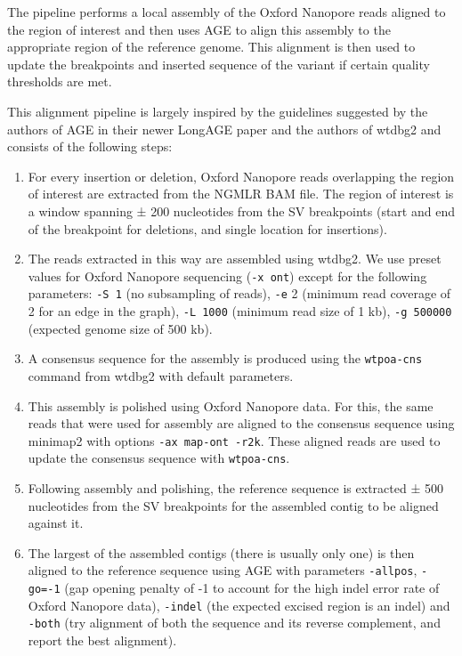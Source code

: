 \documentclass[12pt]{article}
\begin{document}
The pipeline performs a local assembly of the Oxford Nanopore reads aligned to the region of interest and then uses AGE \citep{age} to align this assembly to the appropriate region of the reference genome.
This alignment is then used to update the breakpoints and inserted sequence of the variant if certain quality thresholds are met.

This alignment pipeline is largely inspired by the guidelines suggested by the authors of AGE in their newer LongAGE paper \citep{longage} and the authors of wtdbg2 \citep{wtdbg2} and consists of the following steps:

\begin{enumerate}
	\item For every insertion or deletion, Oxford Nanopore reads overlapping the region of interest are extracted from the NGMLR \citep{ngmlr} BAM file. 
		The region of interest is a window spanning ± 200 nucleotides from the SV breakpoints (start and end of the breakpoint for deletions, and single location for insertions).
\item  The reads extracted in this way are assembled using wtdbg2. 
	We use preset values for Oxford Nanopore sequencing (\texttt{-x ont}) except for the following parameters: \texttt{-S 1} (no subsampling of reads), \texttt{-e} 2 (minimum read coverage of 2 for an edge in the graph), \texttt{-L 1000} (minimum read size of 1 kb), \texttt{-g 500000} (expected genome size of 500 kb).
\item A consensus sequence for the assembly is produced using the \texttt{wtpoa-cns} command from wtdbg2 with default parameters.
\item This assembly is polished using Oxford Nanopore data. For this, the same reads that were used for assembly are aligned to the consensus sequence using minimap2 \citep{minimap2} with options \texttt{-ax map-ont -r2k}. These aligned reads are used to update the consensus sequence with \texttt{wtpoa-cns}.
\item Following assembly and polishing, the reference sequence is extracted ± 500 nucleotides from the SV breakpoints for the assembled contig to be aligned against it.
\item The largest of the assembled contigs (there is usually only one) is then aligned to the reference sequence using AGE with parameters \texttt{-allpos}, \texttt{-go=-1} (gap opening penalty of -1 to account for the high indel error rate of Oxford Nanopore data), \texttt{-indel} (the expected excised region is an indel) and \texttt{-both} (try alignment of both the sequence and its reverse complement, and report the best alignment).
\end{enumerate}
\end{document}
